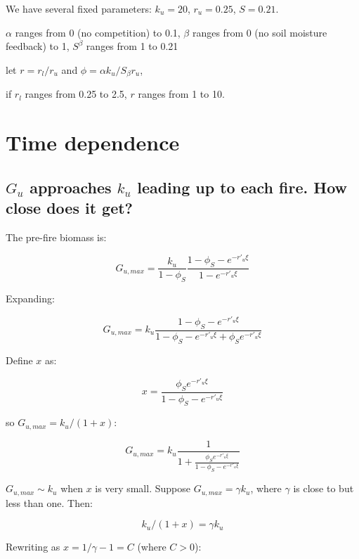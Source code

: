 \documentclass{article}
\begin{document}
We have several fixed parameters:  $k_u = 20$, $r_u = 0.25$, $S=0.21$.

$\alpha$ ranges from 0 (no competition) to 0.1,
$\beta$ ranges from 0 (no soil moisture feedback) to 1, $S^\beta$ ranges from 1  to 0.21

let  $r = r_l/r_u$ and $\phi =  \alpha k_u / S_\beta r_u$,

if $r_l$ ranges from 0.25 to 2.5,  $r$ ranges from 1 to 10.




\section{Time dependence}
 \subsection{ $G_u$ approaches $k_u$  leading up to each fire. How close does it get?}

The  pre-fire biomass is:

\begin{equation}
  G_{u,max} =  \frac{k_u }{1-\phi_S}   \frac{1- \phi_S - e^{-r'_u \xi} }{1 - e^{-r'_u \xi}}
  \label{G_u_max}
\end{equation}

Expanding:

\begin{equation}
  G_{u,max} =  k_u  \frac{1- \phi_S - e^{-r'_u \xi} }{1  - \phi_S - e^{-r'_u \xi} + \phi_S  e^{-r'_u \xi}}
\end{equation}


Define $x$ as:

\begin{equation}
x = \frac{ \phi_S  e^{-r'_u \xi}}{1- \phi_S - e^{-r'_u \xi}}
\end{equation}

so $ G_{u,max} = k_u /(1+x)$:

\begin{equation}
G_{u,max}  = k_u \frac{1}{1 + \frac{ \phi_S  e^{-r'_u \xi}}{1- \phi_S - e^{-r'_u \xi}}}
\end{equation}


$G_{u,max} \sim k_u$ when $x$ is very small.
Suppose $G_{u,max} = \gamma k_u$, where $\gamma$ is close to but less than one.  Then:


\begin{equation}
 k_u /(1+x) = \gamma k_u
\end{equation}

Rewriting as  $x = 1/\gamma  - 1= C$ (where $C> 0$):
\end{document}
